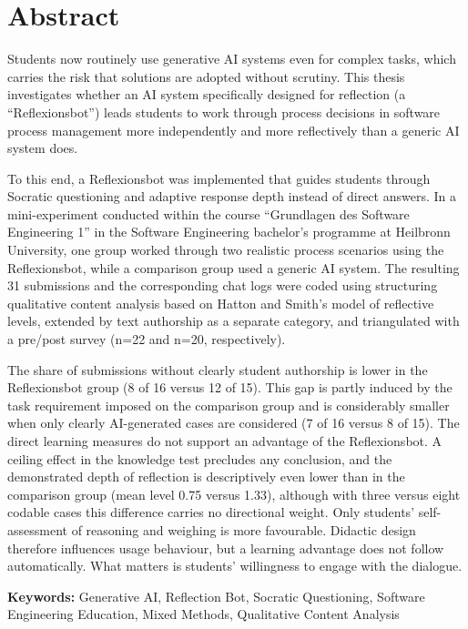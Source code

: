 \chapter*{Abstract}

Students now routinely use generative AI systems even for complex tasks, which carries the risk that
solutions are adopted without scrutiny. This thesis investigates whether an AI system specifically
designed for reflection (a ``Reflexionsbot'') leads students to work through process decisions in
software process management more independently and more reflectively than a generic AI system does.

To this end, a Reflexionsbot was implemented that guides students through Socratic questioning and
adaptive response depth instead of direct answers. In a mini-experiment conducted within the course
``Grundlagen des Software Engineering 1'' in the Software Engineering bachelor's programme at
Heilbronn University, one group worked through two realistic process scenarios using the
Reflexionsbot, while a comparison group used a generic AI system. The resulting 31 submissions and
the corresponding chat logs were coded using structuring qualitative content analysis based on Hatton
and Smith's model of reflective levels, extended by text authorship as a separate category, and
triangulated with a pre/post survey (n=22 and n=20, respectively).

The share of submissions without clearly student authorship is lower in the Reflexionsbot group
(8 of 16 versus 12 of 15). This gap is partly induced by the task requirement imposed on the
comparison group and is considerably smaller when only clearly AI-generated cases are considered
(7 of 16 versus 8 of 15). The direct learning measures do not support an advantage of the
Reflexionsbot. A ceiling effect in the knowledge test precludes any conclusion, and the demonstrated
depth of reflection is descriptively even lower than in the comparison group (mean level 0.75 versus
1.33), although with three versus eight codable cases this difference carries no directional weight.
Only students' self-assessment of reasoning and weighing is more favourable. Didactic design
therefore influences usage behaviour, but a learning advantage does not follow automatically. What
matters is students' willingness to engage with the dialogue.

\vspace{1em}
\noindent\textbf{Keywords:} Generative AI, Reflection Bot, Socratic Questioning, Software Engineering
Education, Mixed Methods, Qualitative Content Analysis

